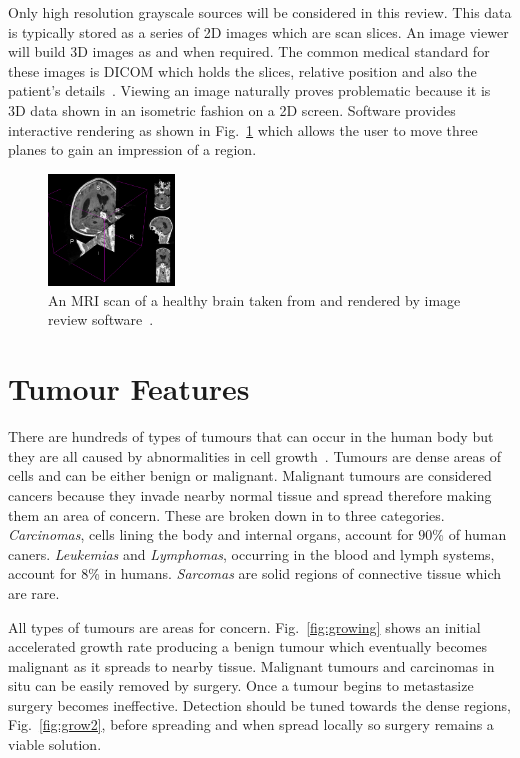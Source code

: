 \documentclass[journal]{IEEEtran}
\begin{document}
Only high resolution grayscale sources will be considered in this review.
This data is typically stored as a series of 2D images which are scan slices.
An image viewer will build 3D images as and when required.
The common medical standard for these images is DICOM which holds the slices, relative position and also the patient's details~\cite{dicom11nema}.
Viewing an image naturally proves problematic because it is 3D data shown in an isometric fashion on a 2D screen.
Software provides interactive rendering as shown in Fig.~\ref{fig:3d} which allows the user to move three planes to gain an impression of a region.

\begin{figure}[!htb]
   \centering
   \includegraphics[width = 0.3\textwidth]{Figures/3Dview.png}
   \caption{An MRI scan of a healthy brain taken from and rendered by image review software~\cite{cia,slicer}.}
   \label{fig:3d}
\end{figure}












\section{Tumour Features}
\label{sec:tumour}

There are hundreds of types of tumours that can occur in the human body but they are all caused by abnormalities in cell growth~\cite{cooper1992cancer}.
Tumours are dense areas of cells and can be either benign or malignant.
Malignant tumours are considered cancers because they invade nearby normal tissue and spread therefore making them an area of concern.
These are broken down in to three categories.
\emph{Carcinomas}, cells lining the body and internal organs, account for $90$\% of human caners.
\emph{Leukemias} and \emph{Lymphomas}, occurring in the blood and lymph systems, account for $8$\% in humans.
\emph{Sarcomas} are solid regions of connective tissue which are rare.

All types of tumours are areas for concern.
Fig.~\ref{fig:growing} shows an initial accelerated growth rate producing a benign tumour which eventually becomes malignant as it spreads to nearby tissue.
Malignant tumours and carcinomas in situ can be easily removed by surgery.
Once a tumour begins to metastasize surgery becomes ineffective. 
Detection should be tuned towards the dense regions, Fig.~\ref{fig:grow2}, before spreading and when spread locally so surgery remains a viable solution.    
\end{document}
